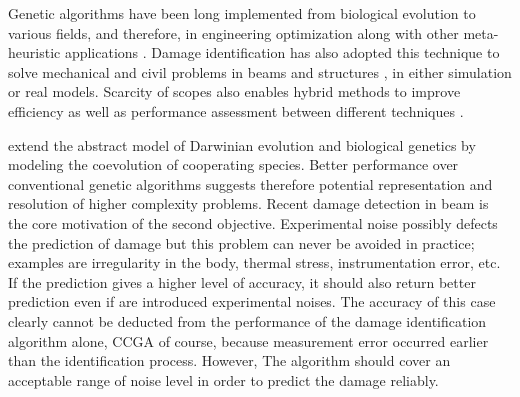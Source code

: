 Genetic algorithms \cite{holland1975} have been long implemented from biological evolution to various fields, and therefore, in engineering optimization along with other meta-heuristic applications \cite{melanie99}. Damage identification has also adopted this technique to solve mechanical and civil problems in beams \cite{rao2004} and structures \cite{hu2001, nobahari2011}, in either simulation or real models. Scarcity of scopes also enables hybrid methods to improve efficiency \cite{meruane2011} as well as performance assessment between different techniques \cite{perera2009}. 

\citet{potter1994} extend the abstract model of Darwinian evolution and biological genetics by modeling the coevolution of cooperating species. Better performance over conventional genetic algorithms suggests therefore potential representation and resolution of higher complexity problems. 
Recent damage detection in beam \cite{panigrahi} is the core motivation of the second objective. Experimental noise possibly defects the prediction of damage but this problem can never be avoided in practice; examples are irregularity in the body, thermal stress, instrumentation error, etc. If the prediction gives a higher level of accuracy, it should also return better prediction even if are introduced experimental noises. The accuracy of this case clearly cannot be deducted from the performance of the damage identification algorithm alone, CCGA of course, because measurement error occurred earlier than the identification process. However, The algorithm should cover an acceptable range of noise level in order to predict the damage reliably.
